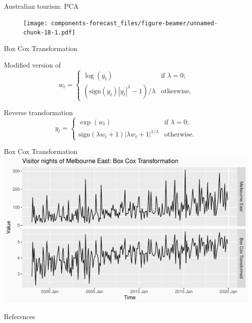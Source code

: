 \documentclass[14pt,ignorenonframetext,]{beamer}
\newif\ifbibliography
\begin{document}
\begin{frame}{Australian tourism: PCA}
\protect\hypertarget{australian-tourism-pca}{}
\begin{figure}

{\centering \texttt{[image: components-forecast\_files/figure-beamer/unnamed-chunk-18-1.pdf]}

}

\end{figure}
\end{frame}

\begin{frame}{Box Cox Transformation}
\protect\hypertarget{box-cox-transformation}{}
\begin{block}{Modified version of \citet{Bickel1981-hv}}
\protect\hypertarget{modified-version-of-bickel1981-hv}{}
\[
w_t  =
\begin{cases}
\log(y_t) & \text{if } \lambda=0;  \\
(\text{sign}(y_t)|y_t|^\lambda-1)/\lambda & \text{otherwise},
\end{cases}
\]
\end{block}

\begin{block}{Reverse transformation}
\protect\hypertarget{reverse-transformation}{}
\[
y_{t} =
\begin{cases}
\exp(w_{t}) & \text{if } \lambda=0;\\
\text{sign}(\lambda w_t+1)|\lambda w_t+1|^{1/\lambda} & \text{otherwise}.
\end{cases}
\]
\end{block}
\end{frame}

\begin{frame}{Box Cox Transformation}
\protect\hypertarget{box-cox-transformation-1}{}
\includegraphics[width=\linewidth]{plot/p_boxcox}
\end{frame}

                    \renewcommand\refname{References}
              \begin{frame}[allowframebreaks]{References}
    \fontsize{9}{10}\selectfont
    \bibliographytrue
    
    \end{frame}
  
\end{document}

